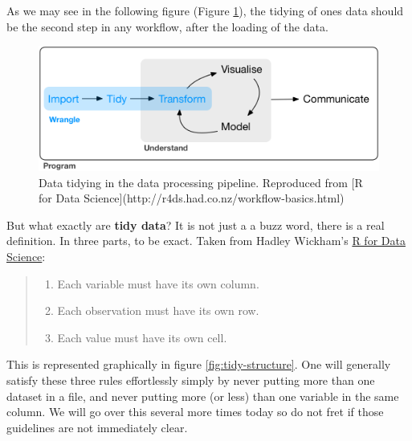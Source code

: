 \documentclass[]{book}
\providecommand{\tightlist}{%
  \setlength{\itemsep}{0pt}\setlength{\parskip}{0pt}}
\theoremstyle{definition}
\theoremstyle{definition}
\theoremstyle{definition}
\theoremstyle{remark}
\begin{document}
As we may see in the following figure (Figure \ref{fig:tidy}), the
tidying of ones data should be the second step in any workflow, after
the loading of the data.

\begin{figure}

{\centering \includegraphics[width=1\linewidth]{figures/data-science-wrangle} 

}

\caption{Data tidying in the data processing pipeline. Reproduced from [R for Data Science](http://r4ds.had.co.nz/workflow-basics.html)}\label{fig:tidy}
\end{figure}

But what exactly are \textbf{tidy data}? It is not just a a buzz word,
there is a real definition. In three parts, to be exact. Taken from
Hadley Wickham's \href{http://r4ds.had.co.nz/workflow-basics.html}{R for
Data Science}:

\begin{quote}
\begin{enumerate}
\def\labelenumi{\arabic{enumi}.}
\tightlist
\item
  Each variable must have its own column.\\
\item
  Each observation must have its own row.\\
\item
  Each value must have its own cell.
\end{enumerate}
\end{quote}

This is represented graphically in figure \ref{fig:tidy-structure}. One
will generally satisfy these three rules effortlessly simply by never
putting more than one dataset in a file, and never putting more (or
less) than one variable in the same column. We will go over this several
more times today so do not fret if those guidelines are not immediately
clear.
\end{document}
